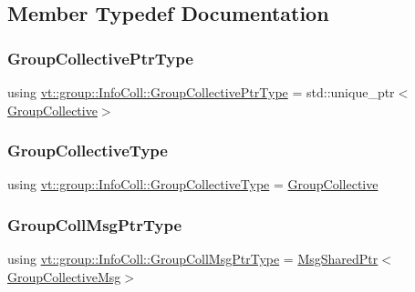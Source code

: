 \subsection{Member Typedef Documentation}
\mbox{\label{structvt_1_1group_1_1_info_coll_a96f3e779eb522034ee3db6c93b3f4c6b}} 
\subsubsection{\texorpdfstring{Group\+Collective\+Ptr\+Type}{GroupCollectivePtrType}}
{\footnotesize\ttfamily using \hyperlink{structvt_1_1group_1_1_info_coll_a96f3e779eb522034ee3db6c93b3f4c6b}{vt\+::group\+::\+Info\+Coll\+::\+Group\+Collective\+Ptr\+Type} =  std\+::unique\+\_\+ptr$<$\hyperlink{structvt_1_1group_1_1_group_collective}{Group\+Collective}$>$}

\mbox{\label{structvt_1_1group_1_1_info_coll_a49957a600d853362ccc55f1ad9d1b173}} 
\subsubsection{\texorpdfstring{Group\+Collective\+Type}{GroupCollectiveType}}
{\footnotesize\ttfamily using \hyperlink{structvt_1_1group_1_1_info_coll_a49957a600d853362ccc55f1ad9d1b173}{vt\+::group\+::\+Info\+Coll\+::\+Group\+Collective\+Type} =  \hyperlink{structvt_1_1group_1_1_group_collective}{Group\+Collective}}

\mbox{\label{structvt_1_1group_1_1_info_coll_a1fcdc451e1e99aedebf302b234c529a6}} 
\subsubsection{\texorpdfstring{Group\+Coll\+Msg\+Ptr\+Type}{GroupCollMsgPtrType}}
{\footnotesize\ttfamily using \hyperlink{structvt_1_1group_1_1_info_coll_a1fcdc451e1e99aedebf302b234c529a6}{vt\+::group\+::\+Info\+Coll\+::\+Group\+Coll\+Msg\+Ptr\+Type} =  \hyperlink{namespacevt_ab2b3d506ec8e8d1540aede826d84a239}{Msg\+Shared\+Ptr}$<$\hyperlink{namespacevt_1_1group_a4c1183efe0185992fefb3ab38a55a8a7}{Group\+Collective\+Msg}$>$}

